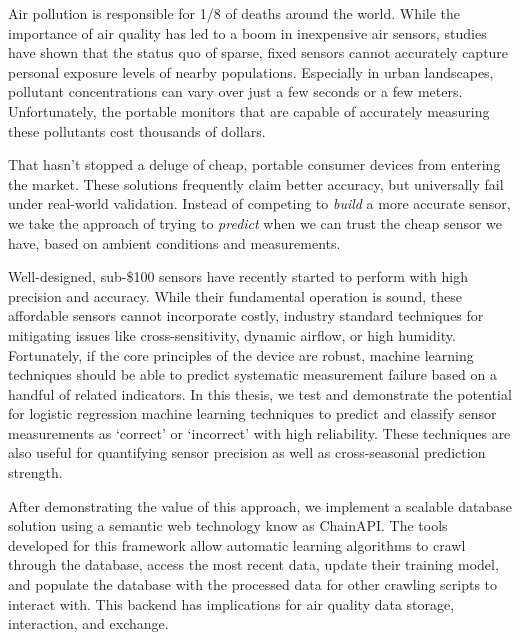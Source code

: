 % 
% 
%

\small
Air pollution is responsible for 1/8 of deaths around the world.  While the importance of air quality has led to a boom in inexpensive air sensors, studies have shown that the status quo of sparse, fixed sensors cannot accurately capture personal exposure levels of nearby populations.  Especially in urban landscapes, pollutant concentrations can vary over just a few seconds or a few meters.  Unfortunately, the portable monitors that are capable of accurately measuring these pollutants cost thousands of dollars.
  
That hasn't stopped a deluge of cheap, portable consumer devices from entering the market.  These solutions frequently claim better accuracy, but universally fail under real-world validation.  Instead of competing to \textit{build} a more accurate sensor, we take the approach of trying to \textit{predict} when we can trust the cheap sensor we have, based on ambient conditions and measurements.

Well-designed, sub-\$100 sensors have recently started to perform with high precision and accuracy.  While their fundamental operation is sound, these affordable sensors cannot incorporate costly, industry standard techniques for mitigating issues like cross-sensitivity, dynamic airflow, or high humidity.  Fortunately, if the core principles of the device are robust, machine learning techniques should be able to predict systematic measurement failure based on a handful of related indicators.  In this thesis, we test and demonstrate the potential for logistic regression machine learning techniques to predict and classify sensor measurements as `correct' or `incorrect' with high reliability.  These techniques are also useful for quantifying sensor precision as well as cross-seasonal prediction strength. 

After demonstrating the value of this approach, we implement a scalable database solution using a semantic web technology know as ChainAPI.  The tools developed for this framework allow automatic learning algorithms to crawl through the database, access the most recent data, update their training model, and populate the database with the processed data for other crawling scripts to interact with.  This backend has implications for air quality data storage, interaction, and exchange.

